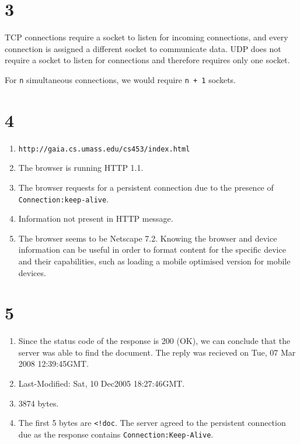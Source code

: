 \section*{3}
TCP connections require a socket to listen for incoming connections, and every connection is assigned a different socket to communicate data. UDP does not require a socket to listen for connections and therefore requires only one socket.

For \texttt{n} simultaneous connections, we would require \texttt{n + 1} sockets.

\section*{4}
\begin{enumerate}[label=\alph*.]
    \item \texttt{http://gaia.cs.umass.edu/cs453/index.html}
    \item The browser is running HTTP 1.1.
    \item The browser requests for a persistent connection due to the presence of\\
            \texttt{Connection:keep-alive}.
    \item Information not present in HTTP message.
    \item The browser seems to be Netscape 7.2. Knowing the browser and device information can be useful in         order to format content for the specific device and their capabilities, such as loading a mobile         optimised version for mobile devices.\cite{UAS}
\end{enumerate}

\section*{5}
\begin{enumerate}[label=\alph*.]
    \item Since the status code of the response is 200 (OK), we can conclude that the server was able to find the document.
    The reply was recieved on Tue, 07 Mar 2008 12:39:45GMT.
    \item Last-Modified: Sat, 10 Dec2005 18:27:46GMT.
    \item 3874 bytes.
    \item The first 5 bytes are \texttt{<!doc}. The server agreed to the persistent connection due as the response contains \texttt{Connection:Keep-Alive}.
\end{enumerate}

